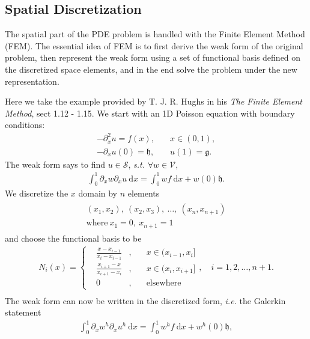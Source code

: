 \subsection{Spatial Discretization}
The spatial part of the PDE problem is handled with the Finite Element Method (FEM). The essential idea of FEM is to first derive the weak form of the original problem, then represent the weak form using a set of functional basis defined on the discretized space elements, and in the end solve the problem under the new representation. 

Here we take the example provided by T. J. R. Hughs in his \emph{The Finite Element Method}, sect 1.12 - 1.15. We start with an 1D Poisson equation with boundary conditions:
\begin{align}
    -\partial_x^2 u=f(x),&\quad x\in(0,1), \\
    -\partial_x u(0)=\mathfrak{h},&\quad u(1)=\mathfrak{g}.
\end{align}
The weak form says to find $u\in\mathcal{S}$, \emph{s.t.} $\forall w\in\mathcal{V}$,
\begin{align}
    \int_0^1\!\partial_x w\partial_x u~\mathrm{d}x
    =\int_0^1\! w f~\mathrm{d}x + w(0)\mathfrak{h}.
\end{align}
We discretize the $x$ domain by $n$ elements \begin{align*}
    \begin{gathered}
        (x_1,x_2),~(x_2,x_3),~\ldots,~(x_n, x_{n+1})\\
        \mathrm{where}~x_1=0,~x_{n+1}=1
    \end{gathered}
\end{align*}
and choose the functional basis to be
\begin{align}
    N_i(x)=\left\{\begin{aligned}
        &\frac{x-x_{i-1}}{x_i-x_{i-1}}&,&\quad x\in(x_{i-1},x_i]\\
        &\frac{x_{i+1}-x}{x_{i+1}-x_i}&,&\quad x\in(x_{i},x_{i+1}]\\
        &0&,&\quad \mathrm{elsewhere}
    \end{aligned}\right.
    ,\quad i=1,2,\ldots,n+1. \\
\end{align}
The weak form can now be written in the discretized form, \emph{i.e.} the Galerkin statement
\begin{align}
    \int_0^1\!\partial_x w^h\partial_x u^h~\mathrm{d}x
    =\int_0^1\! w^h f~\mathrm{d}x + w^h(0)\mathfrak{h},
\end{align}
